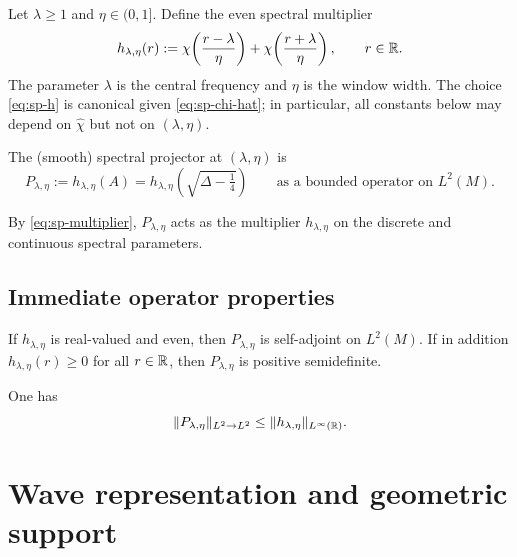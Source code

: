Let $\lambda\ge 1$ and $\eta\in(0,1]$. Define the even spectral multiplier
\begin{equation}\label{eq:sp-h}
h_{\lambda,\eta}(r)
:=\chi\!\left(\frac{r-\lambda}{\eta}\right)+\chi\!\left(\frac{r+\lambda}{\eta}\right),
\qquad r\in\mathbb{R}.
\end{equation}
The parameter $\lambda$ is the central frequency and $\eta$ is the window width. The choice \eqref{eq:sp-h}
is canonical given \eqref{eq:sp-chi-hat}; in particular, all constants below may depend on $\widehat\chi$ but not on $(\lambda,\eta)$.

\begin{definition}\label{def:spectral-projector}
The (smooth) spectral projector at $(\lambda,\eta)$ is
\begin{equation}\label{eq:sp-projector}
P_{\lambda,\eta}:=h_{\lambda,\eta}(A)=h_{\lambda,\eta}\!\left(\sqrt{\Delta-\tfrac14}\right)
\qquad\text{as a bounded operator on }L^2(M).
\end{equation}
\end{definition}

By \eqref{eq:sp-multiplier}, $P_{\lambda,\eta}$ acts as the multiplier $h_{\lambda,\eta}$ on the discrete and
continuous spectral parameters.

\subsection{Immediate operator properties}\label{subsec:sp-basic}

\begin{lemma}\label{lem:sp-sa-pos}
If $h_{\lambda,\eta}$ is real-valued and even, then $P_{\lambda,\eta}$ is self-adjoint on $L^2(M)$.
If in addition $h_{\lambda,\eta}(r)\ge 0$ for all $r\in\mathbb{R}$, then $P_{\lambda,\eta}$ is positive semidefinite.
\end{lemma}

\begin{lemma}\label{lem:sp-L2norm}
One has
\begin{equation}\label{eq:sp-L2norm}
\|P_{\lambda,\eta}\|_{L^2\to L^2}\le \|h_{\lambda,\eta}\|_{L^\infty(\mathbb{R})}.
\end{equation}
\end{lemma}

\section{Wave representation and geometric support}\label{sec:sp-wave}

